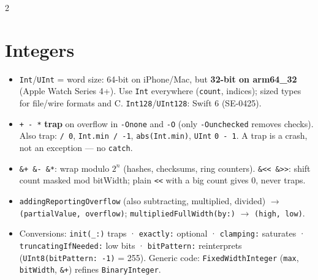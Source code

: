 \documentclass[8pt]{extarticle}
\begin{document}
\begin{multicols}{2}
\raggedright

\section{Integers}
\begin{itemize}
  \item \texttt{Int}/\texttt{UInt} = word size: 64-bit on iPhone/Mac, but
        \textbf{32-bit on arm64\_32} (Apple Watch Series 4+). Use \texttt{Int}
        everywhere (\texttt{count}, indices); sized types for file/wire formats
        and C. \texttt{Int128}/\texttt{UInt128}: Swift 6 (SE-0425).
  \item \texttt{+ - *} \textbf{trap} on overflow in \texttt{-Onone} and
        \texttt{-O} (only \texttt{-Ounchecked} removes checks). Also trap:
        \texttt{/ 0}, \texttt{Int.min / -1}, \texttt{abs(Int.min)},
        \texttt{UInt} \texttt{0 - 1}. A trap is a crash, not an exception —
        no \texttt{catch}.
  \item \texttt{\&+ \&- \&*}: wrap modulo $2^n$ (hashes, checksums, ring
        counters). \texttt{\&<< \&>>}: shift count masked mod bitWidth;
        plain \texttt{<<} with a big count gives 0, never traps.
  \item \texttt{addingReportingOverflow} (also subtracting, multiplied,
        divided) $\to$ \texttt{(partialValue, overflow)};
        \texttt{multipliedFullWidth(by:)} $\to$ \texttt{(high, low)}.
  \item Conversions: \texttt{init(\_:)} traps · \texttt{exactly:} optional ·
        \texttt{clamping:} saturates · \texttt{truncatingIfNeeded:} low bits
        · \texttt{bitPattern:} reinterprets (\texttt{UInt8(bitPattern: -1)} =
        255). Generic code: \texttt{FixedWidthInteger} (\texttt{max},
        \texttt{bitWidth}, \texttt{\&+}) refines \texttt{BinaryInteger}.
\end{itemize}


\end{multicols}
\end{document}
